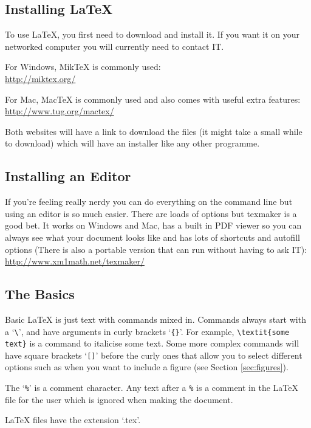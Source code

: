\documentclass[11pt,a4paper,oneside]{article}
\begin{document}
\subsection{Installing \LaTeX}
To use \LaTeX, you first need to download and install it.  If you want it on your networked computer you will currently need to contact IT. 

For Windows, MikTeX is commonly used:\\
\url{http://miktex.org/}

For Mac,  MacTeX is commonly used and also comes with useful extra features:\\
\url{http://www.tug.org/mactex/}

Both websites will have a link to download the files (it might take a small while to download) which will have an installer like any other programme. 

\subsection{Installing an Editor}
If you're feeling really nerdy you can do everything on the command line but using an editor is so much easier.  There are loads of options but texmaker is a good bet.  It works on Windows and Mac, has a built in PDF viewer so you can always see what your document looks like and has lots of shortcuts and autofill options (There is also a portable version that can run without having to ask IT):\\
\url{http://www.xm1math.net/texmaker/}

\subsection{The Basics}
Basic \LaTeX{} is just text with commands mixed in.  Commands always start with a `\verb!\!', and have arguments in curly brackets `\verb!{}!'. For example, \verb!\textit{some text}! is a command to italicise some text. Some more complex commands will have square brackets `\verb![]!' before the curly ones that allow you to select different options such as when you want to include a figure (see Section \ref{sec:figures}).

The `\verb!%!' is a comment character.  Any text after a \verb!%! is a comment in the \LaTeX{} file for the user which is ignored when making the document.

\LaTeX{} files have the extension `.tex'.
\end{document}
